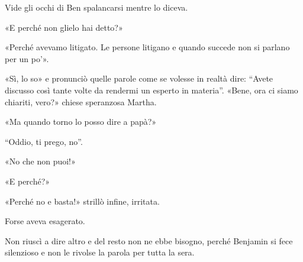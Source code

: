 Vide gli occhi di Ben spalancarsi mentre lo diceva.

«E perché non glielo hai detto?»

«Perché avevamo litigato. Le persone litigano e quando succede non si parlano per un po'».

«Sì, lo so» e pronunciò quelle parole come se volesse in realtà dire: ``Avete discusso così tante
volte da rendermi un esperto in materia''. «Bene, ora ci siamo chiariti, vero?» chiese speranzosa
Martha.

«Ma quando torno lo posso dire a papà?»

``Oddio, ti prego, no''.

«No che non puoi!»

«E perché?»

«Perché no e basta!» strillò infine, irritata.

Forse aveva esagerato.

Non riuscì a dire altro e del resto non ne ebbe bisogno, perché Benjamin si fece silenzioso e non le
rivolse la parola per tutta la sera.
